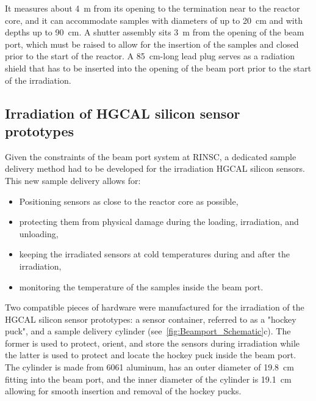 It measures about \SI{4}{\metre} from its opening to the termination near to the reactor core, and it can accommodate samples with diameters of up to \SI{20}{\centi\metre} and with depths up to \SI{90}{\centi\metre}.
A shutter assembly sits \SI{3}{\metre} from the opening of the beam port, which must be raised to allow for the insertion of the samples and closed prior to the start of the reactor.
A \SI{85}{\centi\metre}-long lead plug serves as a radiation shield that has to be inserted into the opening of the beam port prior to the start of the irradiation.

\subsection{Irradiation of HGCAL silicon sensor prototypes}
\label{subsec:irradiation}
Given the constraints of the beam port system at RINSC, a dedicated sample delivery method had to be developed for the irradiation HGCAL silicon sensors.
This new sample delivery allows for:
\begin{itemize}
  \item Positioning sensors as close to the reactor core as possible,
  \item protecting them from physical damage during the loading, irradiation, and unloading,
  \item keeping the irradiated sensors at cold temperatures during and after the irradiation,
  \item monitoring the temperature of the samples inside the beam port.
\end{itemize}
Two compatible pieces of hardware were manufactured for the irradiation of the HGCAL silicon sensor prototypes: a sensor container, referred to as a "hockey puck", and a sample delivery cylinder (see~\ref{fig:Beamport_Schematic}c). 
The former is used to protect, orient, and store the sensors during irradiation while the latter is used to protect and locate the hockey puck inside the beam port.
The cylinder is made from 6061 aluminum, has an outer diameter of \SI{19.8}{\centi\metre} fitting into the beam port, and the inner diameter of the cylinder is \SI{19.1}{\centi\metre} allowing for smooth insertion and removal of the hockey pucks.
